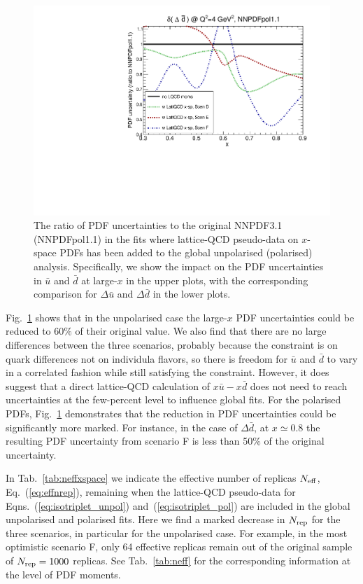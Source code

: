 \begin{figure}[!t]
\includegraphics[scale=0.45]{plots/xdbar-pol-lattice-relerr-xdata-xspace.pdf}
\caption{\small The ratio of PDF uncertainties to the original
  NNPDF3.1 (NNPDFpol1.1) in the fits where lattice-QCD pseudo-data
  on $x$-space PDFs has been added to the global unpolarised
  (polarised) analysis.
  Specifically, we show the impact on the PDF uncertainties
  in $\bar{u}$ and $\bar{d}$ at large-$x$ in the upper
  plots, with the corresponding comparison for $\Delta\bar{u}$
  and $\Delta\bar{d}$ in the lower plots.
}    
\label{fig:impactxspace}
\end{figure}

Fig.~\ref{fig:impactxspace} shows that
in the unpolarised case the large-$x$ PDF uncertainties could be reduced
to $60\%$ of their original value.
%
We also find that there are no large
differences between the three
scenarios,
probably because the constraint is on quark differences not on individula 
flavors, so there is freedom for $\bar u$ and $\bar d$ to vary in a correlated 
fashion while still satisfying the constraint. 
However, it does suggest 
that a direct lattice-QCD calculation
of $x \bar{u}-x \bar{d}$ does not need to reach uncertainties
at the few-percent level to influence global fits.
%
For the polarised PDFs, Fig.~\ref{fig:impactxspace} demonstrates that the
reduction in PDF uncertainties could be significantly more marked.
%
For instance, in the case of $\Delta \bar{d}$, at $x\simeq 0.8$
the resulting PDF uncertainty from scenario F is less than 50\%
of the original uncertainty.

In Tab.~\ref{tab:neffxspace} we indicate the effective number of replicas
$N_{\rm eff}$, Eq.~(\ref{eq:effnrep}), remaining when
the lattice-QCD pseudo-data for Eqns.~(\ref{eq:isotriplet_unpol})
and~(\ref{eq:isotriplet_pol}) are included in the global
   unpolarised and polarised fits.
   Here we find a marked decrease in $N_{\rm rep}$
   for the three scenarios,
   in particular for the unpolarised case.
   For example, in the most optimistic scenario F, only
   64 effective replicas remain out of the
   original sample of $N_{\rm rep}=1000$ replicas.
   See Tab.~\ref{tab:neff} for the corresponding
   information at the level of PDF moments.
   
